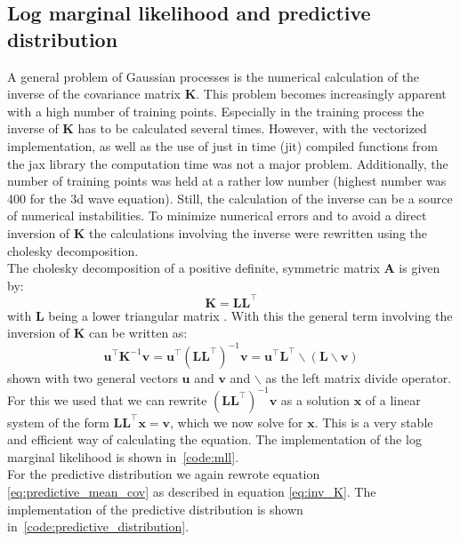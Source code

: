 \documentclass{article}
\begin{document}
\subsection{Log marginal likelihood and predictive distribution}
A general problem of Gaussian processes is the numerical calculation of the inverse of the covariance matrix $\bm{K}$. This problem becomes increasingly apparent with a high number of training points. Especially in the training process the inverse of $\bm{K}$ has to be calculated several times. However, with the vectorized implementation, as well as the use of just in time (jit) compiled functions from the jax library the computation time was not a major problem. Additionally, the number of training points was held at a rather low number (highest number was 400 for the 3d wave equation). Still, the calculation of the inverse can be a source of numerical instabilities. To minimize numerical errors and to avoid a direct inversion of $\bm{K}$ the calculations involving the inverse were rewritten using the cholesky decomposition. \\
The cholesky decomposition of a positive definite, symmetric matrix $\bm{A}$ is given by:
\begin{equation}
    \bm{K} = \bm{L}\bm{L}^\intercal
\end{equation}
with $\bm{L}$ being a lower triangular matrix \cite{RasmussenCarlEdward}. With this the general term involving the inversion of $\bm{K}$ can be written as:
\begin{equation}
    \label{eq:inv_K}
    \bm{u}^\intercal \bm{K}^{-1}\bm{v} = \bm{u}^\intercal (\bm{LL^{\intercal}})^{-1} \bm{v} = \bm{u}^\intercal \bm{L^{\intercal} \backslash (L\backslash v)}
\end{equation}
shown with two general vectors $\bm{u}$ and $\bm{v}$ and $\backslash$ as the left matrix divide operator. For this we used that we can rewrite $(\bm{LL^{\intercal}})^{-1} \bm{v}$ as a solution $\bm{x}$ of a linear system of the form $\bm{LL^{\intercal}} \bm{x}=\bm{v}$, which we now solve for $\bm{x}$. This is a very stable and efficient way of calculating the equation. The implementation of the log marginal likelihood is shown in~\ref{code:mll}.\\


For the predictive distribution we again rewrote equation \ref{eq:predictive_mean_cov} as described in equation \ref{eq:inv_K}. The implementation of the predictive distribution is shown in~\ref{code:predictive_distribution}.\\

\end{document}
